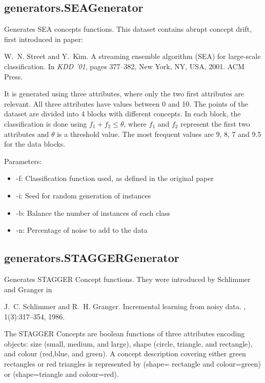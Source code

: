\documentclass[a4paper,12pt,twoside]{book}
\begin{document}
\subsection{generators.SEAGenerator} Generates SEA concepts functions.
This dataset contains abrupt concept drift, 
first introduced  in paper:
 \begin{itemize}
W.~N. Street and Y.~Kim.
\newblock A streaming ensemble algorithm ({SEA}) for large-scale
  classification.
\newblock In {\em KDD '01}, pages 377--382, New York, NY, USA, 2001. ACM Press.
 \end{itemize}
It is generated using three attributes,
where only the two first attributes are relevant. 
All three attributes have values between 0 and 10.
The points of the dataset are divided into $4$ blocks with different concepts. 
In each block,  the classification is done using $f_1+ f_2 \leq \theta$, 
where $f_1$ and $f_2$ represent the first two attributes 
and $\theta$ is a threshold value. 
The most frequent values are 9, 8, 7 and 9.5 for the data blocks. 

Parameters:
\begin{itemize}
\item -f: Classification function used, as defined in the original paper
\item -i: Seed for random generation of instances
\item -b: Balance the number of instances of each class
\item -n: Percentage of noise to add to the data\end{itemize}


\subsection{generators.STAGGERGenerator} Generates STAGGER Concept functions.
They were introduced by Schlimmer and Granger in

\begin{itemize}
J.~C. Schlimmer and R.~H. Granger.
\newblock Incremental learning from noisy data.
, 1(3):317--354, 1986.\end{itemize}

The STAGGER Concepts are boolean functions of three attributes
encoding objects: size (small, medium, and large), shape (circle, triangle, and rectangle), and colour (red,blue, and green).
A concept description
covering either green rectangles or red triangles is represented by (shape= 
rectangle and colour=green) or (shape=triangle and colour=red).
\end{document}
